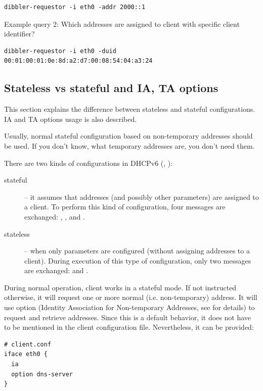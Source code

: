 \begin{lstlisting}
dibbler-requestor -i eth0 -addr 2000::1
\end{lstlisting}

Example query 2: Which addresses are assigned to client with specific client
identifier?

\begin{lstlisting}
dibbler-requestor -i eth0 -duid 00:01:00:01:0e:8d:a2:d7:00:08:54:04:a3:24
\end{lstlisting}

\subsection{Stateless vs stateful and IA, TA options}
\label{features-stateless-stateful}
This section explains the difference between stateless and stateful
configurations. IA and TA options usage is also described.

Usually, normal stateful configuration based on non-temporary
addresses should be used. If you don't know, what temporary addresses
are, you don't need them.

There are two kinds of configurations in DHCPv6 (\cite{rfc3315}, \cite{rfc3736}):
\begin{description}
  \item[stateful] -- it assumes that addresses (and possibly other parameters)
    are assigned to a client. To perform this kind of configuration,
    four messages are exchanged: , ,
     and .
  \item[stateless] -- when only parameters are configured (without
    assigning addresses to a client). During execution of this type of
    configuration, only two messages are exchanged: 
    and .
\end{description}

During normal operation, client works in a stateful mode. If not
instructed otherwise, it will request one or more normal (i.e. non-temporary)
address. It will use  option (Identity Association for
Non-temporary Addresses, see \cite{rfc3315} for details) to request
and retrieve addresses. Since this is a default behavior, it does not
have to be mentioned in the client configuration
file. Nevertheless, it can be provided:

\begin{lstlisting}
# client.conf
iface eth0 {
  ia
  option dns-server
}
\end{lstlisting}

